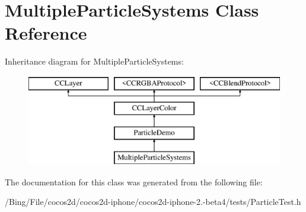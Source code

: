 \hypertarget{interface_multiple_particle_systems}{\section{Multiple\-Particle\-Systems Class Reference}
\label{interface_multiple_particle_systems}
}
Inheritance diagram for Multiple\-Particle\-Systems\-:\begin{figure}[H]
\begin{center}
\leavevmode
\includegraphics[height=4.000000cm]{interface_multiple_particle_systems}
\end{center}
\end{figure}


The documentation for this class was generated from the following file\-:\begin{DoxyCompactItemize}
\item 
/\-Bing/\-File/cocos2d/cocos2d-\/iphone/cocos2d-\/iphone-\/2.-\/beta4/tests/Particle\-Test.\-h\end{DoxyCompactItemize}
